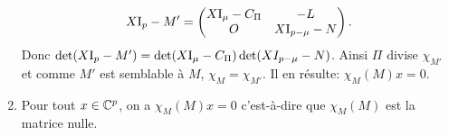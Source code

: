 \begin{solution}
\begin{enumerate}
        $$X \mathrm{I}_p - M' = \begin{pmatrix}
            X \mathrm{I}_\mu - C_\Pi & -L \\
            O & X \mathrm{I}_{p-\mu} - N
        \end{pmatrix}.$$
        Donc $\det(X \mathrm{I}_p - M') = \det(X \mathrm{I}_\mu - C_\Pi) \det(X I_{p-\mu} - N)$. Ainsi $\Pi$ divise $\chi_{M'}$ et comme $M'$ est semblable à $M$, $\chi_M = \chi_{M'}$. Il en résulte: $\chi_M(M)x = 0$.
        \item Pour tout $x \in \mathbb{C}^p$, on a $\chi_M(M)x = 0$ c'est-à-dire que $\chi_M(M)$ est la matrice nulle.
    \end{enumerate}
\end{solution}
